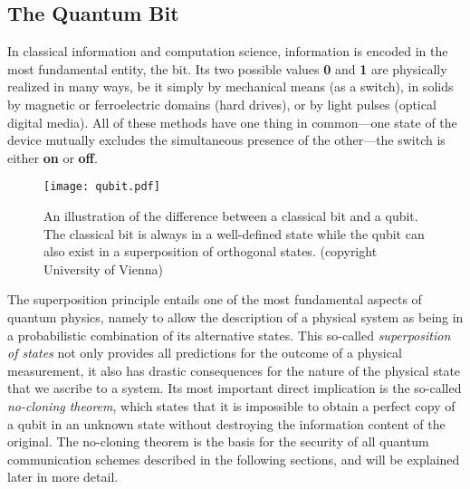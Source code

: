\documentclass{article}
\begin{document}

\subsection{The Quantum Bit}

In classical information and computation science, information is encoded in the most fundamental entity, the bit. Its two possible values \textbf{0} and \textbf{1} are physically realized in many ways, be it simply by mechanical means (as a switch), in solids by magnetic or ferroelectric domains (hard drives), or by light pulses (optical digital media). All of these methods have one thing in common---one state of the device mutually excludes the simultaneous presence of the other---the switch is either \textbf{on} or \textbf{off}.

\begin{figure}[h!]
\centering
\texttt{[image: qubit.pdf]}
\caption{An illustration of the difference between a classical bit and a qubit. The classical bit is always in a well-defined state while the qubit can also exist in a superposition of orthogonal states. (copyright University of Vienna)}
\label{fig:switch}
\end{figure}

The superposition principle entails one of the most fundamental aspects of quantum physics, namely to allow the description of a physical system as being in a probabilistic combination of its alternative states. This so-called \textit{superposition of states} not only provides all predictions for the outcome of a physical measurement, it also has drastic consequences for the nature of the physical state that we ascribe to a system. Its most important direct implication is the so-called \textit{no-cloning theorem}, which states that it is impossible to obtain a perfect copy of a qubit in an unknown state without destroying the information content of the original. The no-cloning theorem is the basis for the security of all quantum communication schemes described in the following sections, and will be explained later in more detail.
\end{document}
